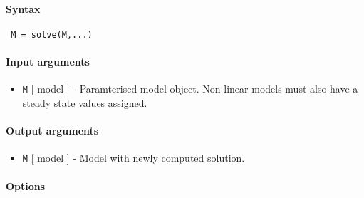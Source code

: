 


	\paragraph{Syntax}
 
 \begin{verbatim}
 M = solve(M,...)
 \end{verbatim}
 
 \paragraph{Input arguments}
 
 \begin{itemize}
 \item
   \texttt{M} {[} model {]} - Paramterised model object. Non-linear
   models must also have a steady state values assigned.
 \end{itemize}
 
 \paragraph{Output arguments}
 
 \begin{itemize}
 \item
   \texttt{M} {[} model {]} - Model with newly computed solution.
 \end{itemize}
 
 \paragraph{Options}
 
